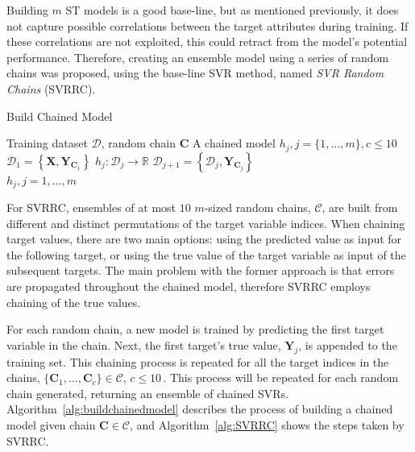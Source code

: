 \documentclass[reqno]{vcuthesis}
\newcommand{\set}[1]{{\left\{#1\right\}}}
\numberwithin{equation}{chapter}
\begin{document}
Building $m$ ST models is a good base-line, but as mentioned previously, it does not capture possible correlations between the target attributes during training. If these correlations are not exploited, this could retract from the model's potential performance. Therefore, creating an ensemble model using a series of random chains was proposed, using the base-line SVR method, named \textit{SVR Random Chains} (SVRRC). 
\begin{algorithm}[t!]
\centering \small
\caption{Build Chained Model}
\label{alg:buildchainedmodel} 
\begin{algorithmic}[1]
\renewcommand{\algorithmicrequire}{\textbf{Input:}}
\renewcommand{\algorithmicensure}{\textbf{Output:}}
\Require Training dataset $\mathcal{D}$, random chain $\bm C$
\Ensure  A chained model $h_j, j = \{1,\ldots,m\}, c \leq 10$
\State $\mathcal{D}_1 = \set{\bm X, \bm Y_{\bm C_1}}$ 
 
\State $h_j : \mathcal{D}_j \rightarrow \mathbb{R}$ 
\State $\mathcal{D}_{j+1} = \set{\mathcal{D}_j, \bm Y_{\bm C_j}}$ 
\EndIf
\EndFor \\
\Return $h_j, j=1,\ldots,m$ 
\end{algorithmic} 
\end{algorithm}

For SVRRC, ensembles of at most $10$ $m$-sized random chains, $\mathcal{C}$, are built from different and distinct permutations of the target variable indices. When chaining target values, there are two main options: using the predicted value as input for the following target, or using the true value of the target variable as input of the subsequent targets. The main problem with the former approach is that errors are propagated throughout the chained model, therefore SVRRC employs chaining of the true values. 

For each random chain, a new model is trained by predicting the first target variable in the chain. Next, the first target's true value, $\bm Y_j$, is appended to the training set. This chaining process is repeated for all the target indices in the chains, $\{\bm C_1, \ldots, \bm C_c\} \in \mathcal{C}, \, c \leq 10 \,$. This process will be repeated for each random chain generated, returning an ensemble of chained SVRs. Algorithm~\ref{alg:buildchainedmodel} describes the process of building a chained model given chain $\bm C \in \mathcal{C}$, and Algorithm~\ref{alg:SVRRC} shows the steps taken by SVRRC. 
\end{document}
